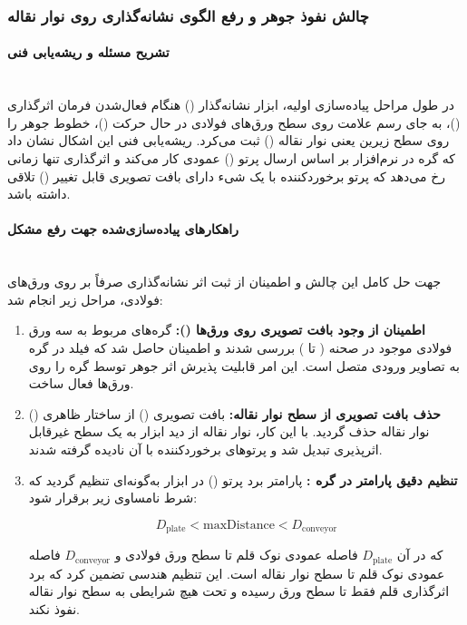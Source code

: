 \documentclass[a4paper, 10pt, twocolumn]{article}
\begin{document}
	\subsubsection*{ چالش نفوذ جوهر و رفع الگوی نشانه‌گذاری روی نوار نقاله}
	
	\paragraph*{تشریح مسئله و ریشه‌یابی فنی } \mbox{} \\
	در طول مراحل پیاده‌سازی اولیه، ابزار نشانه‌گذار () هنگام فعال‌شدن فرمان اثرگذاری ()، به جای رسم علامت روی سطح ورق‌های فولادی در حال حرکت ()، خطوط جوهر را روی سطح زیرین یعنی نوار نقاله () ثبت می‌کرد. ریشه‌یابی فنی این اشکال نشان داد که گره  در نرم‌افزار  بر اساس ارسال پرتو () عمودی کار می‌کند و اثرگذاری تنها زمانی رخ می‌دهد که پرتو برخوردکننده با یک شیء دارای بافت تصویری قابل تغییر () تلاقی داشته باشد.
	
	\paragraph*{راهکارهای پیاده‌سازی‌شده جهت رفع مشکل}\mbox{} \\
	جهت حل کامل این چالش و اطمینان از ثبت اثر نشانه‌گذاری صرفاً بر روی ورق‌های فولادی، مراحل زیر انجام شد:
	\begin{enumerate}
		\item \textbf{اطمینان از وجود بافت تصویری روی ورق‌ها ():} گره‌های مربوط به سه ورق فولادی موجود در صحنه ( تا ) بررسی شدند و اطمینان حاصل شد که فیلد  در گره  به تصاویر ورودی متصل است. این امر قابلیت پذیرش اثر جوهر توسط گره  را روی ورق‌ها فعال ساخت.
		\item \textbf{حذف بافت تصویری از سطح نوار نقاله:} بافت تصویری () از ساختار ظاهری () نوار نقاله حذف گردید. با این کار، نوار نقاله از دید ابزار  به یک سطح غیرقابل اثرپذیری تبدیل شد و پرتوهای برخوردکننده با آن نادیده گرفته شدند.
		\item \textbf{تنظیم دقیق پارامتر  در گره :} پارامتر برد پرتو () در ابزار  به‌گونه‌ای تنظیم گردید که شرط نامساوی زیر برقرار شود:
		
		$$D_{\text{plate}} < \text{maxDistance} < D_{\text{conveyor}}$$
		
		که در آن $D_{\text{plate}}$ فاصله عمودی نوک قلم تا سطح ورق فولادی و $D_{\text{conveyor}}$ فاصله عمودی نوک قلم تا سطح نوار نقاله است. این تنظیم هندسی تضمین کرد که برد اثرگذاری قلم فقط تا سطح ورق رسیده و تحت هیچ شرایطی به سطح نوار نقاله نفوذ نکند.
	\end{enumerate}
	
\end{document}
